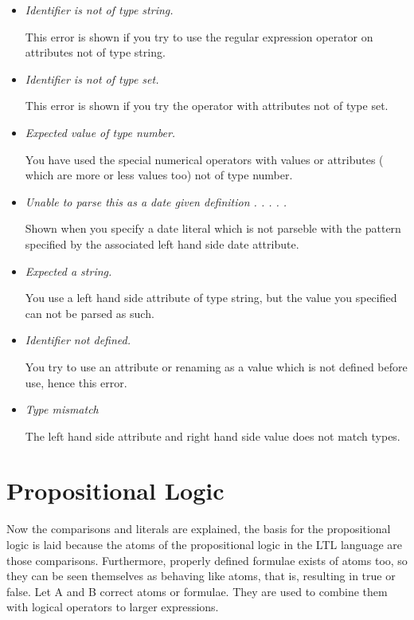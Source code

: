 \begin{itemize}

\item \textit{Identifier is not of type string.}

This error is shown if you try to use the regular expression operator
\ltl{\~{}=} on attributes not of type string.

\item \textit{Identifier is not of type set.}

This error is shown if you try the  operator with attributes not of
type set.

\item \textit{Expected value of type number.}

You have used the special numerical operators with values or attributes (
which are more or less values too) not of type number.

\item \textit{Unable to parse this as a date given definition . . . . .}

Shown when you specify a date literal which is not parseble with the pattern
specified by the associated left hand side date attribute.

\item \textit{Expected a string.}

You use a left hand side attribute of type string, but the value you specified
can not be parsed as such.

\item \textit{Identifier not defined.}

You try to use an attribute or renaming as a value which is not defined before
use, hence this error.

\item \textit{Type mismatch}

The left hand side attribute and right hand side value does not match types.

\end{itemize}

\section{Propositional Logic}
\label{language:proposition}

Now the comparisons and literals are explained, the basis for the
propositional logic is laid because the atoms of the propositional logic in
the LTL language are those comparisons. Furthermore, properly defined formulae
exists of atoms too, so they can be seen themselves as behaving like atoms,
that is, resulting in true or false. Let A and B correct atoms or formulae.
They are used to combine them with logical operators to larger expressions.

